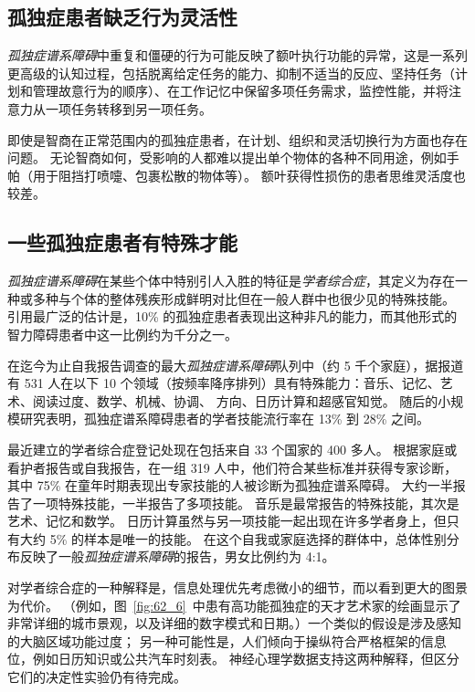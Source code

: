 \subsection{孤独症患者缺乏行为灵活性}

\textit{孤独症谱系障碍}中重复和僵硬的行为可能反映了额叶执行功能的异常，这是一系列更高级的认知过程，包括脱离给定任务的能力、抑制不适当的反应、坚持任务（计划和管理故意行为的顺序）、在工作记忆中保留多项任务需求，监控性能，并将注意力从一项任务转移到另一项任务。


即使是智商在正常范围内的孤独症患者，在计划、组织和灵活切换行为方面也存在问题。
无论智商如何，受影响的人都难以提出单个物体的各种不同用途，例如手帕（用于阻挡打喷嚏、包裹松散的物体等）。
额叶获得性损伤的患者思维灵活度也较差。



\subsection{一些孤独症患者有特殊才能}

\textit{孤独症谱系障碍}在某些个体中特别引人入胜的特征是\textit{学者综合症}，其定义为存在一种或多种与个体的整体残疾形成鲜明对比但在一般人群中也很少见的特殊技能。
引用最广泛的估计是，10\% 的孤独症患者表现出这种非凡的能力，而其他形式的智力障碍患者中这一比例约为千分之一。


在迄今为止自我报告调查的最大\textit{孤独症谱系障碍}队列中（约 5 千个家庭），据报道有 531 人在以下 10 个领域（按频率降序排列）具有特殊能力：音乐、记忆、艺术、阅读过度、数学、机械、协调、 方向、日历计算和超感官知觉。
随后的小规模研究表明，孤独症谱系障碍患者的学者技能流行率在 13\% 到 28\% 之间。


最近建立的学者综合症登记处现在包括来自 33 个国家的 400 多人。
根据家庭或看护者报告或自我报告，在一组 319 人中，他们符合某些标准并获得专家诊断，其中 75\% 在童年时期表现出专家技能的人被诊断为孤独症谱系障碍。
大约一半报告了一项特殊技能，一半报告了多项技能。
音乐是最常报告的特殊技能，其次是艺术、记忆和数学。
日历计算虽然与另一项技能一起出现在许多学者身上，但只有大约 5\% 的样本是唯一的技能。
在这个自我或家庭选择的群体中，总体性别分布反映了一般\textit{孤独症谱系障碍}的报告，男女比例约为 4:1。


对学者综合症的一种解释是，信息处理优先考虑微小的细节，而以看到更大的图景为代价。
（例如，图~\ref{fig:62_6}~中患有高功能孤独症的天才艺术家的绘画显示了非常详细的城市景观，以及详细的数字模式和日期。）一个类似的假设是涉及感知的大脑区域功能过度；
另一种可能性是，人们倾向于操纵符合严格框架的信息位，例如日历知识或公共汽车时刻表。
神经心理学数据支持这两种解释，但区分它们的决定性实验仍有待完成。



